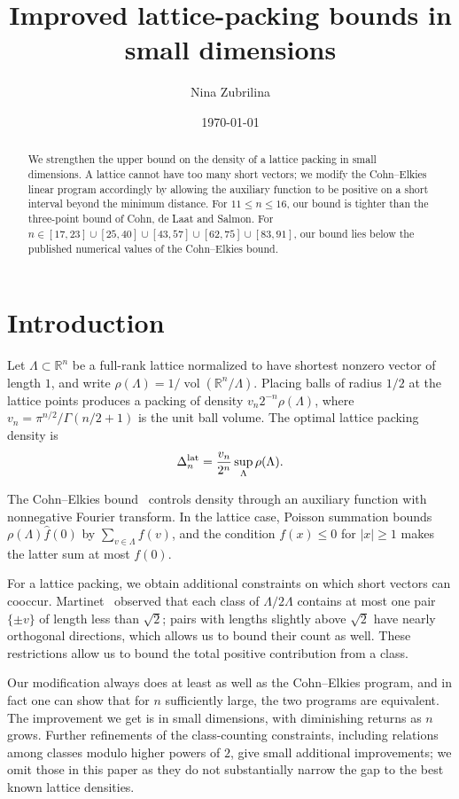 \documentclass[11pt]{article}
\title{Improved lattice-packing bounds in small dimensions}
\author{Nina Zubrilina}
\date{\today}
\newcommand{\R}{\mathbb R}
\begin{document}
\maketitle
\begin{abstract}
We strengthen the upper bound on the density of a lattice packing in small dimensions. A lattice cannot have too many short vectors; we modify the Cohn--Elkies linear program accordingly by allowing the auxiliary function to be positive on a short interval beyond the minimum distance. For $11 \leq n \leq 16$, our bound is tighter than the three-point bound of Cohn, de Laat and Salmon. For $n \in [17, 23] \cup [25, 40] \cup [43, 57] \cup [62, 75]\cup [83, 91]$, our bound lies below the published numerical values of the Cohn--Elkies bound.
\end{abstract}
\newcommand{\CertificateCount}{82}
\newcommand{\ImprovementCount}{67}
\newcommand{\ImprovementDimensions}{11--23, 25--40, 43--57, 62--75, 83--91}
\newcommand{\SmallestMargins}{$0.0117\%$ at $n=62$, $0.0167\%$ at $n=91$, $0.0177\%$ at $n=75$, $0.0859\%$ at $n=83$}
\section{Introduction}
Let $\Lambda\subset\R^n$ be a full-rank lattice normalized to have shortest nonzero vector of length $1$, and write
$\rho(\Lambda)=1/\operatorname{vol}(\R^n/\Lambda)$. Placing balls of radius $1/2$ at the lattice points produces a packing of density $v_n2^{-n}\rho(\Lambda)$, where
$v_n=\pi^{n/2}/\Gamma(n/2+1)$ is the unit ball volume. The optimal lattice packing density is
\[
 \Delta_n^{\rm lat}=\frac{v_n}{2^n}\sup_\Lambda\rho(\Lambda).
\]

The Cohn--Elkies bound~\cite{CE} controls density through an auxiliary
function with nonnegative Fourier transform. In the lattice case,
Poisson summation bounds $\rho(\Lambda)\widehat f(0)$ by
$\sum_{v\in \Lambda}f(v)$, and the condition $f(x)\le0$ for $|x|\ge1$
makes the latter sum at most $f(0)$. 

For a lattice packing, we obtain additional constraints on which short vectors can cooccur. Martinet~\cite{Martinet} observed that each class of $\Lambda/2 \Lambda$ contains at most one pair $\{\pm v\}$ of length less than $\sqrt2$; pairs with lengths slightly above $\sqrt2$ have nearly orthogonal
directions, which allows us to bound their count as well. These restrictions allow
us to bound the total positive contribution from a class. 

Our modification always does at least as well as the Cohn--Elkies program, and in fact one can show that for $n$ sufficiently large, the two programs are equivalent. The improvement we get is in small dimensions, with diminishing returns as $n$ grows.  Further refinements of the class-counting constraints, including relations among classes modulo higher powers of \(2\), give small additional improvements; we omit those in this paper as they do not substantially narrow the gap to the best known lattice densities.
\end{document}
